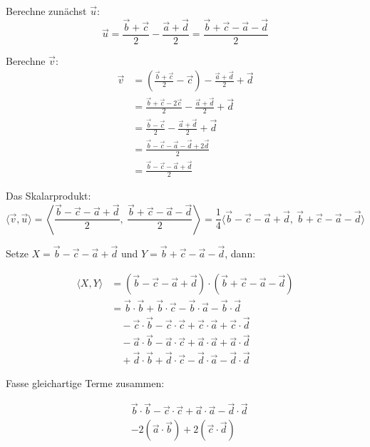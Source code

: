 \documentclass[12pt,a4paper]{article}
\begin{document}
\noindent Berechne zunächst $\vec{u}$:
\[
\vec{u} = \frac{\vec{b} + \vec{c}}{2} - \frac{\vec{a} + \vec{d}}{2}
= \frac{\vec{b} + \vec{c} - \vec{a} - \vec{d}}{2}
\]

\noindent Berechne $\vec{v}$:
\begin{align*}
\vec{v} &= \left( \frac{\vec{b} + \vec{c}}{2} - \vec{c} \right) - \frac{\vec{a} + \vec{d}}{2} + \vec{d} \\
&= \frac{\vec{b} + \vec{c} - 2\vec{c}}{2} - \frac{\vec{a} + \vec{d}}{2} + \vec{d} \\
&= \frac{\vec{b} - \vec{c}}{2} - \frac{\vec{a} + \vec{d}}{2} + \vec{d} \\
&= \frac{\vec{b} - \vec{c} - \vec{a} - \vec{d} + 2\vec{d}}{2} \\
&= \frac{\vec{b} - \vec{c} - \vec{a} + \vec{d}}{2}
\end{align*}

\noindent Das Skalarprodukt:
\[
\langle \vec{v}, \vec{u} \rangle = 
\left\langle 
\frac{\vec{b} - \vec{c} - \vec{a} + \vec{d}}{2},\ 
\frac{\vec{b} + \vec{c} - \vec{a} - \vec{d}}{2} 
\right\rangle 
= \frac{1}{4} \langle 
\vec{b} - \vec{c} - \vec{a} + \vec{d},\ 
\vec{b} + \vec{c} - \vec{a} - \vec{d} 
\rangle
\]

\noindent Setze $X = \vec{b} - \vec{c} - \vec{a} + \vec{d}$ und $Y = \vec{b} + \vec{c} - \vec{a} - \vec{d}$, dann:

\begin{align*}
\langle X, Y \rangle 
&= (\vec{b} - \vec{c} - \vec{a} + \vec{d}) \cdot (\vec{b} + \vec{c} - \vec{a} - \vec{d}) \\
&= \vec{b} \cdot \vec{b} + \vec{b} \cdot \vec{c} - \vec{b} \cdot \vec{a} - \vec{b} \cdot \vec{d} \\
&\quad - \vec{c} \cdot \vec{b} - \vec{c} \cdot \vec{c} + \vec{c} \cdot \vec{a} + \vec{c} \cdot \vec{d} \\
&\quad - \vec{a} \cdot \vec{b} - \vec{a} \cdot \vec{c} + \vec{a} \cdot \vec{a} + \vec{a} \cdot \vec{d} \\
&\quad + \vec{d} \cdot \vec{b} + \vec{d} \cdot \vec{c} - \vec{d} \cdot \vec{a} - \vec{d} \cdot \vec{d}
\end{align*}

\noindent Fasse gleichartige Terme zusammen:

\begin{align*}
&\vec{b} \cdot \vec{b} - \vec{c} \cdot \vec{c} + \vec{a} \cdot \vec{a} - \vec{d} \cdot \vec{d} \\
&- 2 (\vec{a} \cdot \vec{b}) + 2 (\vec{c} \cdot \vec{d})
\end{align*}
\end{document}
